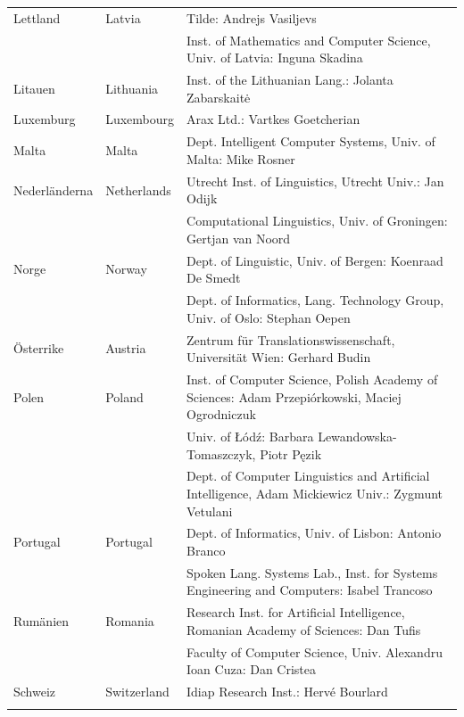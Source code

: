 \begin{longtable}{llp{105mm}}
  Lettland & \textcolor{grey1}{Latvia} & Tilde: Andrejs Vasiljevs\\ \addlinespace 
  & & Inst. of Mathematics and Computer Science, Univ. of Latvia: Inguna Skadina\\ \addlinespace
  Litauen & \textcolor{grey1}{Lithuania} & Inst. of the Lithuanian Lang.: Jolanta Zabarskaitė\\ \addlinespace
  Luxemburg & \textcolor{grey1}{Luxembourg} & Arax Ltd.: Vartkes Goetcherian\\ \addlinespace
  Malta & \textcolor{grey1}{Malta} & Dept. Intelligent Computer Systems, Univ. of Malta: Mike Rosner\\ \addlinespace
  Nederländerna & \textcolor{grey1}{Netherlands} & Utrecht Inst. of Linguistics, Utrecht Univ.: Jan Odijk\\ \addlinespace 
  & & Computational Linguistics, Univ. of Groningen: Gertjan van Noord\\ \addlinespace
  Norge & \textcolor{grey1}{Norway} & Dept. of Linguistic, Univ. of Bergen: Koenraad De Smedt\\ \addlinespace 
  & & Dept. of Informatics, Lang. Technology Group, Univ. of Oslo: Stephan Oepen \\ \addlinespace
  Österrike & \textcolor{grey1}{Austria} & Zentrum für Translationswissenschaft, Universität Wien: Gerhard Budin\\ \addlinespace 
  Polen & \textcolor{grey1}{Poland} & Inst. of Computer Science, Polish Academy of Sciences: Adam Przepiórkowski, Maciej Ogrodniczuk \\ \addlinespace
  & & Univ. of Łódź: Barbara Lewandowska-Tomaszczyk, Piotr Pęzik\\ \addlinespace
  & & Dept. of Computer Linguistics and Artificial Intelligence, Adam Mickiewicz Univ.: Zygmunt Vetulani \\ \addlinespace
  Portugal & \textcolor{grey1}{Portugal} & Dept. of Informatics, Univ. of Lisbon: Antonio Branco\\ \addlinespace
  & & Spoken Lang. Systems Lab., Inst. for Systems Engineering and Computers: Isabel Trancoso \\ \addlinespace
  Rumänien & \textcolor{grey1}{Romania} & Research Inst. for Artificial Intelligence, Romanian Academy of Sciences: Dan Tufis \\ \addlinespace
  & & Faculty of Computer Science, Univ. Alexandru Ioan Cuza: Dan Cristea \\ \addlinespace
  Schweiz & \textcolor{grey1}{Switzerland} & Idiap Research Inst.: Hervé Bourlard \\ \addlinespace 

\end{longtable}
